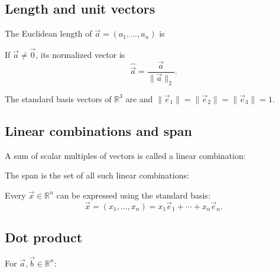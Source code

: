 \documentclass{article}
\begin{document}
\subsection{Length and unit vectors}
The Euclidean length of $\vec{a}=(a_1,\dots,a_n)$ is

If $\vec{a}\neq\vec{0}$, its normalized vector is
\[
    \widehat{\vec{a}}=\frac{\vec{a}}{\lVert\vec{a}\rVert_2}.
\]

The standard basis vectors of $\mathbb{R}^3$ are
and $\lVert\vec{e}_1\rVert=\lVert\vec{e}_2\rVert
=\lVert\vec{e}_3\rVert=1$.

\subsection{Linear combinations and span}
A sum of scalar multiples of vectors is called a linear combination:

The span is the set of all such linear combinations:

Every $\vec{x}\in\mathbb{R}^n$ can be expressed using the standard basis:
\[
    \vec{x}=(x_1,\dots,x_n)
    =x_1\vec{e}_1+\cdots+x_n\vec{e}_n.
\]

\subsection{Dot product}
For $\vec{a},\vec{b}\in\mathbb{R}^n$:
\end{document}
